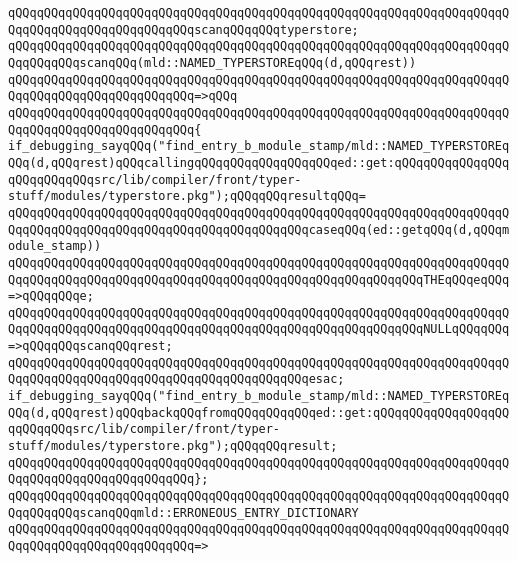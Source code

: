 \verb|qQQqqQQqqQQqqQQqqQQqqQQqqQQqqQQqqQQqqQQqqQQqqQQqqQQqqQQqqQQqqQQqqQQqqQQqqQQqqQQqqQQqqQQqqQQqqQQqscanqQQqqQQqtyperstore;|\newline
\newline
\verb|qQQqqQQqqQQqqQQqqQQqqQQqqQQqqQQqqQQqqQQqqQQqqQQqqQQqqQQqqQQqqQQqqQQqqQQqqQQqqQQqscanqQQq(mld::NAMED_TYPERSTOREqQQq(d,qQQqrest))|\newline
\verb|qQQqqQQqqQQqqQQqqQQqqQQqqQQqqQQqqQQqqQQqqQQqqQQqqQQqqQQqqQQqqQQqqQQqqQQqqQQqqQQqqQQqqQQqqQQqqQQq=>qQQq|\newline
\verb|qQQqqQQqqQQqqQQqqQQqqQQqqQQqqQQqqQQqqQQqqQQqqQQqqQQqqQQqqQQqqQQqqQQqqQQqqQQqqQQqqQQqqQQqqQQqqQQq{|\newline
\verb|if_debugging_sayqQQq("find_entry_b_module_stamp/mld::NAMED_TYPERSTOREqQQq(d,qQQqrest)qQQqcallingqQQqqQQqqQQqqQQqqQQqed::get:qQQqqQQqqQQqqQQqqQQqqQQqqQQqsrc/lib/compiler/front/typer-stuff/modules/typerstore.pkg");qQQqqQQqresultqQQq=|\newline
\verb|qQQqqQQqqQQqqQQqqQQqqQQqqQQqqQQqqQQqqQQqqQQqqQQqqQQqqQQqqQQqqQQqqQQqqQQqqQQqqQQqqQQqqQQqqQQqqQQqqQQqqQQqqQQqqQQqcaseqQQq(ed::getqQQq(d,qQQqmodule_stamp))|\newline
\newline
\verb|qQQqqQQqqQQqqQQqqQQqqQQqqQQqqQQqqQQqqQQqqQQqqQQqqQQqqQQqqQQqqQQqqQQqqQQqqQQqqQQqqQQqqQQqqQQqqQQqqQQqqQQqqQQqqQQqqQQqqQQqqQQqqQQqTHEqQQqeqQQq=>qQQqqQQqe;|\newline
\verb|qQQqqQQqqQQqqQQqqQQqqQQqqQQqqQQqqQQqqQQqqQQqqQQqqQQqqQQqqQQqqQQqqQQqqQQqqQQqqQQqqQQqqQQqqQQqqQQqqQQqqQQqqQQqqQQqqQQqqQQqqQQqqQQqNULLqQQqqQQq=>qQQqqQQqscanqQQqrest;|\newline
\verb|qQQqqQQqqQQqqQQqqQQqqQQqqQQqqQQqqQQqqQQqqQQqqQQqqQQqqQQqqQQqqQQqqQQqqQQqqQQqqQQqqQQqqQQqqQQqqQQqqQQqqQQqqQQqqQQqesac;|\newline
\verb|if_debugging_sayqQQq("find_entry_b_module_stamp/mld::NAMED_TYPERSTOREqQQq(d,qQQqrest)qQQqbackqQQqfromqQQqqQQqqQQqed::get:qQQqqQQqqQQqqQQqqQQqqQQqqQQqsrc/lib/compiler/front/typer-stuff/modules/typerstore.pkg");qQQqqQQqresult;|\newline
\verb|qQQqqQQqqQQqqQQqqQQqqQQqqQQqqQQqqQQqqQQqqQQqqQQqqQQqqQQqqQQqqQQqqQQqqQQqqQQqqQQqqQQqqQQqqQQqqQQq};|\newline
\newline
\verb|qQQqqQQqqQQqqQQqqQQqqQQqqQQqqQQqqQQqqQQqqQQqqQQqqQQqqQQqqQQqqQQqqQQqqQQqqQQqqQQqscanqQQqmld::ERRONEOUS_ENTRY_DICTIONARY|\newline
\verb|qQQqqQQqqQQqqQQqqQQqqQQqqQQqqQQqqQQqqQQqqQQqqQQqqQQqqQQqqQQqqQQqqQQqqQQqqQQqqQQqqQQqqQQqqQQqqQQq=>|\newline
